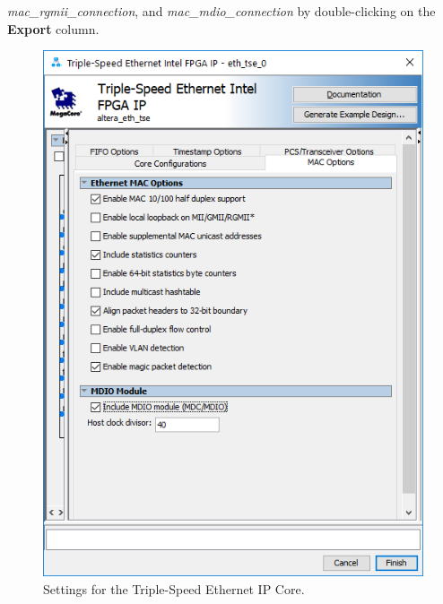 \documentclass[11pt, twoside, pdftex]{article}
\begin{document}
\begin{enumerate}
\begin{itemize}
			{\it mac\_rgmii\_connection}, and {\it mac\_mdio\_connection} by double-clicking on the {\bf Export} column.
		\end{itemize}
	
		\begin{figure}[H]
			\centering
			  \includegraphics[scale=0.65]{figures/tse_ethernet_settings.png}
			\caption{Settings for the Triple-Speed Ethernet IP Core.} 
			\label{fig:tse_ethernet_settings}
		\end{figure}


\end{enumerate}
\end{document}
